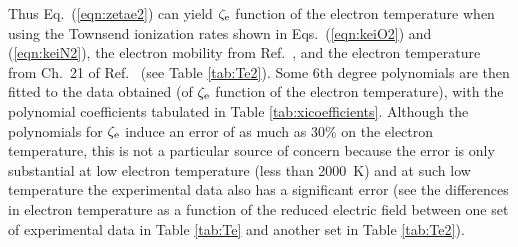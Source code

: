 \documentclass{warpdoc}
\let\citen\cite
\begin{document}
Thus Eq.\ (\ref{eqn:zetae2}) can yield $\zeta_{\rm e}$ function of the electron temperature when using the Townsend ionization rates shown in Eqs.\ (\ref{eqn:keiO2}) and (\ref{eqn:keiN2}), the electron mobility from Ref.\ \cite{jcp:2014:parent}, and the electron temperature from Ch.\ 21 of Ref.\ \citen{book:1997:grigoriev} (see Table \ref{tab:Te2}). Some 6th degree polynomials are then fitted to the data obtained (of $\zeta_{\rm e}$ function of the electron temperature), with the polynomial coefficients tabulated in Table \ref{tab:xicoefficients}. Although the polynomials for $\zeta_{\rm e}$ induce an error of as much as 30\% on the electron temperature, this is not a particular source of concern because the error is only substantial at low electron temperature (less than 2000~K) and at such low temperature the experimental data also has a significant error (see the differences in electron temperature as a function of the reduced electric field between one set of experimental data in Table \ref{tab:Te} and another set in Table \ref{tab:Te2}).   
\end{document}
